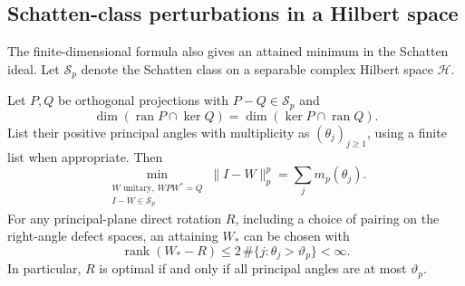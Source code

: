 \subsection{Schatten-class perturbations in a Hilbert space}

The finite-dimensional formula also gives an attained minimum in the
Schatten ideal. Let $\mathcal S_p$ denote the Schatten class on a separable
complex Hilbert space $\mathcal H$.

\begin{theorem}
\label{thm:schatten-ideal-minimum}
Let $P,Q$ be orthogonal projections with $P-Q\in\mathcal S_p$ and
\[
 \dim(\operatorname{ran}P\cap\ker Q)
   =\dim(\ker P\cap\operatorname{ran}Q).
\]
List their positive principal angles with multiplicity as
$(\theta_j)_{j\geq1}$, using a finite list when appropriate. Then
\begin{equation}
 \min_{\substack{W\text{ unitary},\ WPW^*=Q\\ I-W\in\mathcal S_p}}
       \|I-W\|_p^p=\sum_j m_p(\theta_j).
 \label{eq:schatten-ideal-minimum}
\end{equation}
For any principal-plane direct rotation $R$, including a choice of pairing
on the right-angle defect spaces, an attaining $W_*$ can be chosen with
\begin{equation}
 \operatorname{rank}(W_*-R)
       \leq 2\,\#\{j:\theta_j>\vartheta_p\}<\infty.
 \label{eq:schatten-finite-correction}
\end{equation}
In particular, $R$ is optimal if and only if all principal angles are at
most $\vartheta_p$.
\end{theorem}

